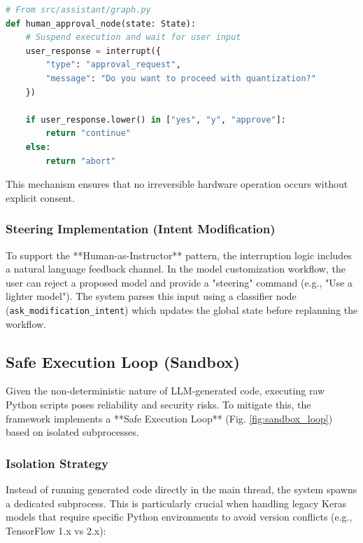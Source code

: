 \begin{lstlisting}[language=Python, caption={Implementation of an explicit approval gate using LangGraph interrupt.}, label={lst:alloc}]
# From src/assistant/graph.py
def human_approval_node(state: State):
    # Suspend execution and wait for user input
    user_response = interrupt({
        "type": "approval_request",
        "message": "Do you want to proceed with quantization?"
    })
    
    if user_response.lower() in ["yes", "y", "approve"]:
        return "continue"
    else:
        return "abort"
\end{lstlisting}

This mechanism ensures that no irreversible hardware operation occurs without explicit consent.

\subsubsection{Steering Implementation (Intent Modification)}
To support the **Human-as-Instructor** pattern, the interruption logic includes a natural language feedback channel. In the model customization workflow, the user can reject a proposed model and provide a "steering" command (e.g., "Use a lighter model"). The system parses this input using a classifier node (\texttt{ask\_modification\_intent}) which updates the global state before replanning the workflow.

\subsection{Safe Execution Loop (Sandbox)}

Given the non-deterministic nature of LLM-generated code, executing raw Python scripts poses reliability and security risks. To mitigate this, the framework implements a **Safe Execution Loop** (Fig. \ref{fig:sandbox_loop}) based on isolated subprocesses.

\subsubsection{Isolation Strategy}
Instead of running generated code directly in the main thread, the system spawns a dedicated subprocess. This is particularly crucial when handling legacy Keras models that require specific Python environments to avoid version conflicts (e.g., TensorFlow 1.x vs 2.x):

